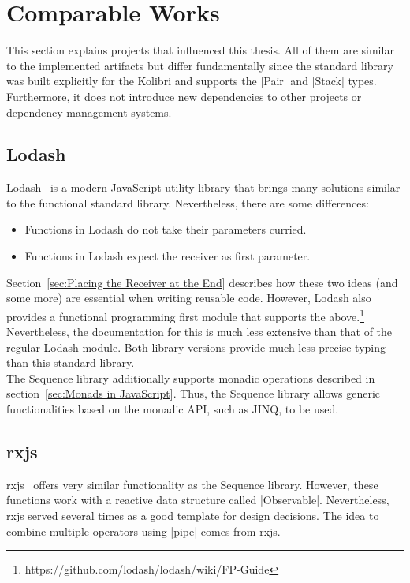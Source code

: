 \section{Comparable Works} %
\label{sec:Comparable Works}
This section explains projects that influenced this thesis. All of them are
similar to the implemented artifacts but differ fundamentally since the
standard library was built explicitly for the Kolibri and supports the |Pair|
and |Stack| types. Furthermore, it does not introduce new dependencies to other
projects or dependency management systems.

\subsection{Lodash} %
\label{sub:Lodash}
Lodash~\cite{lodash_2023} is a modern JavaScript utility library that brings many solutions
similar to the functional standard library. Nevertheless, there are some differences:
\begin{itemize}
  \item Functions in Lodash do not take their parameters curried.
  \item Functions in Lodash expect the receiver as first parameter.
\end{itemize}
Section~\ref{sec:Placing the Receiver at the End} describes how these two
ideas (and some more) are essential when writing reusable code. However, Lodash
also provides a functional programming first module that supports the
above.\footnote{https://github.com/lodash/lodash/wiki/FP-Guide}
Nevertheless, the documentation for this is much less extensive than that of
the regular Lodash module. Both library versions provide much less precise
typing than this standard library.\\
The Sequence library additionally supports monadic operations described in
section~\ref{sec:Monads in JavaScript}. Thus, the Sequence
library allows generic functionalities based on the monadic API, such as JINQ,
to be used.

\subsection{rxjs} %
\label{sub:rxjs}
rxjs~\cite{rxjs_2023} offers very similar functionality as the Sequence library.
However, these functions work with a reactive data structure called
|Observable|. Nevertheless, rxjs served several times as a good template for
design decisions. The idea to combine multiple operators using |pipe| comes
from rxjs.

